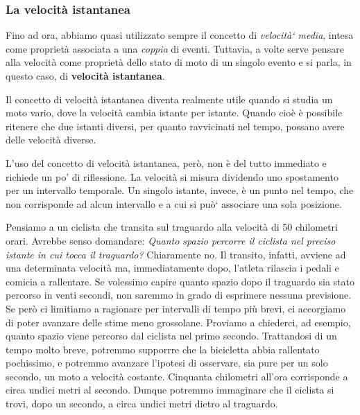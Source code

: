 \subsubsection*{La velocità istantanea}

Fino ad ora, abbiamo quasi utilizzato sempre il concetto di {\slshape velocità` media}, intesa come proprietà associata a una {\slshape coppia} di eventi.\newline
Tuttavia, a volte serve pensare alla velocità come proprietà dello stato di moto di un singolo evento e si parla, in questo caso, di {\bf velocità istantanea}.\newline

Il concetto di velocità istantanea diventa realmente utile quando si studia un moto vario, dove la velocità cambia istante per istante. Quando cioè è possibile ritenere che due istanti diversi, per quanto ravvicinati nel tempo, possano avere
delle velocità diverse.\newline

L’uso del concetto di velocità istantanea, però, non è del tutto immediato e richiede un po’ di riflessione.
La velocità si misura dividendo uno spostamento per un intervallo temporale. Un singolo istante, invece, è un punto nel tempo, che non corrisponde ad alcun intervallo e a cui si può` associare una sola posizione.\newline

Pensiamo a un ciclista che transita sul traguardo alla velocità di 50 chilometri orari. Avrebbe senso domandare: {\slshape Quanto spazio percorre il ciclista nel preciso istante in cui tocca il traguardo?} Chiaramente no. Il transito, infatti, avviene
ad una determinata velocità ma, immediatamente dopo, l’atleta rilascia i pedali e comicia a rallentare. Se volessimo capire quanto spazio dopo il traguardo sia stato percorso in venti secondi, non saremmo in grado di esprimere nessuna previsione. Se però ci limitiamo a ragionare per intervalli di tempo più brevi, ci accorgiamo di poter avanzare delle stime meno grossolane. Proviamo a chiederci, ad esempio, quanto spazio viene percorso dal ciclista nel primo secondo.
Trattandosi di un tempo molto breve, potremmo supporrre che la bicicletta abbia rallentato pochissimo, e potremmo avanzare l’ipotesi di osservare, sia pure per un solo secondo, un moto a velocità costante. Cinquanta chilometri all’ora corrisponde a circa undici metri al secondo. Dunque potremmo immaginare che il ciclista si trovi, dopo un secondo, a circa undici metri dietro al traguardo.\newline


